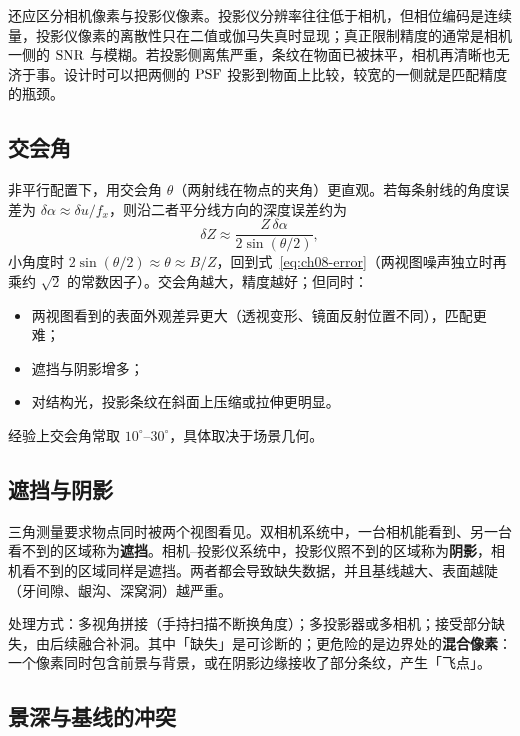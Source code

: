 还应区分相机像素与投影仪像素。投影仪分辨率往往低于相机，但相位编码是连续量，投影仪像素的离散性只在二值或伽马失真时显现；真正限制精度的通常是相机一侧的 $\mathrm{SNR}$ 与模糊。若投影侧离焦严重，条纹在物面已被抹平，相机再清晰也无济于事。设计时可以把两侧的 $\mathrm{PSF}$ 投影到物面上比较，较宽的一侧就是匹配精度的瓶颈。

\subsection{交会角}

非平行配置下，用交会角 $\theta$（两射线在物点的夹角）更直观。若每条射线的角度误差为 $\delta\alpha\approx\delta u/f_x$，则沿二者平分线方向的深度误差约为
\begin{equation}
  \delta Z\approx\frac{Z\,\delta\alpha}{2\sin(\theta/2)},
  \label{eq:ch08-angle}
\end{equation}
小角度时 $2\sin(\theta/2)\approx\theta\approx B/Z$，回到式~\eqref{eq:ch08-error}（两视图噪声独立时再乘约 $\sqrt2$ 的常数因子）。交会角越大，精度越好；但同时：
\begin{itemize}
  \item 两视图看到的表面外观差异更大（透视变形、镜面反射位置不同），匹配更难；
  \item 遮挡与阴影增多；
  \item 对结构光，投影条纹在斜面上压缩或拉伸更明显。
\end{itemize}
经验上交会角常取 $10^\circ$--$30^\circ$，具体取决于场景几何。

\subsection{遮挡与阴影}

三角测量要求物点同时被两个视图看见。双相机系统中，一台相机能看到、另一台看不到的区域称为\textbf{遮挡}。相机–投影仪系统中，投影仪照不到的区域称为\textbf{阴影}，相机看不到的区域同样是遮挡。两者都会导致缺失数据，并且基线越大、表面越陡（牙间隙、龈沟、深窝洞）越严重。

处理方式：多视角拼接（手持扫描不断换角度）；多投影器或多相机；接受部分缺失，由后续融合补洞。其中「缺失」是可诊断的；更危险的是边界处的\textbf{混合像素}：一个像素同时包含前景与背景，或在阴影边缘接收了部分条纹，产生「飞点」。

\subsection{景深与基线的冲突}

